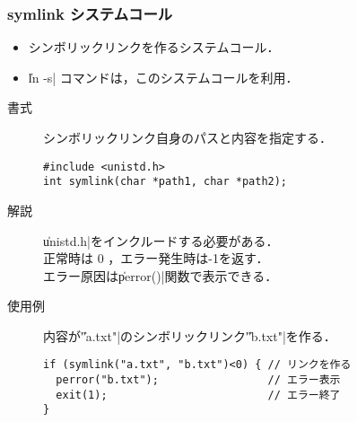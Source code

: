 \documentclass{beamer}                 %
\begin{document}
\begin{frame}[fragile]
  \frametitle{symlink システムコール}
  \begin{itemize}
  \item シンボリックリンクを作るシステムコール．
  \item \|ln -s| コマンドは，このシステムコールを利用．
  \end{itemize}

  \begin{description}
  \item[書式] シンボリックリンク自身のパスと内容を指定する．
\begin{verbatim}
#include <unistd.h>
int symlink(char *path1, char *path2);
\end{verbatim}

  \item[解説] \|unistd.h|をインクルードする必要がある．\\
    正常時は 0 ，エラー発生時は-1を返す．\\
    エラー原因は\|perror()|関数で表示できる．

  \item[使用例] 内容が\|"a.txt"|のシンボリックリンク\|"b.txt"|を作る．
\begin{verbatim}
if (symlink("a.txt", "b.txt")<0) { // リンクを作る
  perror("b.txt");                 // エラー表示
  exit(1);                         // エラー終了
}
\end{verbatim}
\end{description}
\end{frame}
\end{document}
